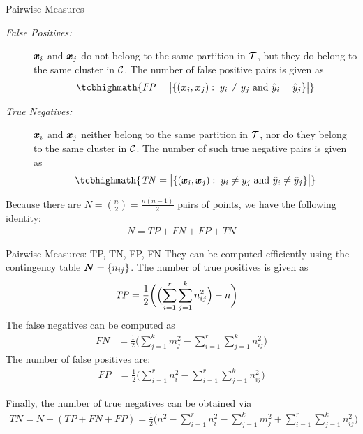 \begin{frame}{Pairwise Measures}
  \begin{description}
\item[\textit{False Positives:}]
  ${\boldsymbol x}_i$ and ${\boldsymbol x}_{j}$ do not belong to the
  same partition in ${\mathcal T}$, but they do belong to the same cluster in ${\mathcal C}$.
  The
  number of false positive pairs is given as
  \begin{align*}
\tcbhighmath{
  \mathit{FP} = \bigl|\{(\bx_i, \bx_{j}):\; y_i \ne y_{j}
  \text{ and } \hy_i = \hy_{j} \}\bigr|
}
  \end{align*}

\item[\textit{True Negatives:}] ${\boldsymbol x}_i$ and ${\boldsymbol x}_{j}$ neither belong to
  the same partition in ${\mathcal T}$, nor do they belong to the same cluster in
  ${\mathcal C}$.  The number of such true negative pairs is given as
    \begin{align*}
\tcbhighmath{
  \mathit{TN} = \bigl|\{(\bx_i, \bx_{j}):\; y_i \ne y_{j}
  \text{ and } \hy_i \ne \hy_{j} \}\bigr|
}
  \end{align*}
\end{description}

Because there are $N = {n \choose 2} = \frac{n(n-1)}{2}$ pairs of points, we
have the following identity:
\begin{align*}
  N = \mathit{TP} + \mathit{FN} + \mathit{FP} + \mathit{TN}
\end{align*}
\end{frame}

\begin{frame}{Pairwise Measures: TP, TN, FP, FN}
They can be computed eff\/{i}ciently using the
contingency table ${\boldsymbol N} = \left\{ n_{ij} \right\}$.
The number of true positives is given as
\begin{align*}
  \mathit{TP} 
  & = \frac{1}{2} \biggl(\Bigl(\sum_{i=1}^r \sum_{j=1}^k n_{ij}^2\Bigr)
  - n \biggr)
\end{align*}
The false negatives can be computed as
\begin{align*}
  \mathit{FN} 
  & = \frac{1}{2}\biggl(
  \sum_{j=1}^k m_{j}^2 - \sum_{i=1}^r \sum_{j=1}^k n_{ij}^2 \biggr)
\end{align*}
The number of false positives are:
\begin{align*}
\mathit{FP} & =
  \frac{1}{2}\biggl(
  \sum_{i=1}^r n_i^2 - \sum_{i=1}^r \sum_{j=1}^k n_{ij}^2 \biggr)
\end{align*}

F{i}nally, the number of true negatives can be obtained via
\begin{align*}
  \mathit{TN} = N - (\mathit{TP} + \mathit{FN} + \mathit{FP}) = \frac{1}{2} \biggl(
  n^2 - \sum_{i=1}^r n_i^2 - \sum_{j=1}^k m_{j}^2 +
  \sum_{i=1}^r \sum_{j=1}^k n_{ij}^2
  \biggr)
\end{align*}
\end{frame}



